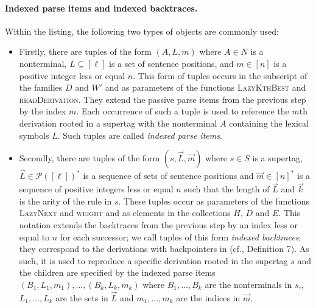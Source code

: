 \documentclass[../../document.tex]{subfiles}
\begin{document}
    \paragraph{Indexed parse items and indexed backtraces.}
    Within the listing, the following two types of objects are commonly used:
    \begin{itemize}
        \item
            Firstly, there are tuples of the form \((A, L, m)\) where \(A \in N\) is a nonterminal, \(L \subseteq [\ell]\) is a set of sentence positions, and \(m \in [n]\) is a positive integer less or equal \(n\).
            This form of tuples occurs in the subscript of the families \(D\) and \(W'\) and as parameters of the functions \textsc{LazyKthBest} and \textsc{readDerivation}.
            They extend the passive parse items from the previous step by the index \(m\).
            Each occurrence of such a tuple is used to reference the \(m\)th derivation rooted in a supertag with the nonterminal \(A\) containing the lexical symbols \(L\).
            Such tuples are called \emph{indexed parse items}.
        \item
            Secondly, there are tuples of the form \((s, \vec{L}, \vec{m})\) where \(s\in S\) is a supertag, \(\vec{L} \in \mathcal{P}([\ell])^*\) is a sequence of sets of sentence positions and \(\vec{m} \in [n]^*\) is a sequence of positive integers less or equal \(n\) such that the length of \(\vec{L}\) and \(\vec{k}\) is the arity of the  rule in \(s\).
            These tuples occur as parameters of the functions \textsc{LazyNext} and \textsc{weight} and as elements in the collections \(H\), $D$ and $E$.
            This notation extends the backtraces from the previous step by an index less or equal to \(n\) for each successor; we call tuples of this form \emph{indexed backtraces}; they correspond to the derivations with backpointers in  (cf.\@ \citealp{HuaChia05}, Definition 7).
            As such, it is used to reproduce a specific derivation rooted in the supertag \(s\) and the children are specified by the indexed parse items \((B_1, L_1, m_1), \ldots, (B_k, L_k, m_k)\) where \(B_1, \ldots, B_k\) are the  nonterminals in \(s\),, \(L_1, \ldots, L_k\) are the sets in \(\vec{L}\) and \(m_1, \ldots, m_k\) are the indices in \(\vec{m}\).
    \end{itemize}
\end{document}
